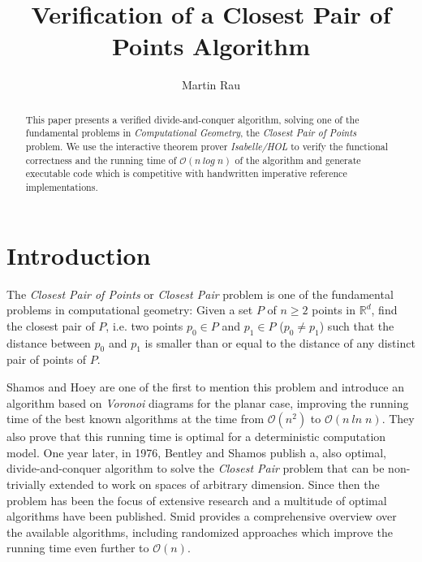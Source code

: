 \documentclass{llncs}
\begin{document}
\title{Verification of a Closest Pair of Points Algorithm}
\author{Martin Rau}
\date{}
\maketitle

\begin{abstract}
This paper presents a verified divide-and-conquer algorithm, solving one of the fundamental problems
in \textit{Computational Geometry}, the \textit{Closest Pair of Points} problem.
We use the interactive theorem prover \textit{Isabelle/HOL} to verify the functional correctness
and the running time of $\mathcal{O}(n\ \mathit{log}\;n)$ of the algorithm and generate executable code 
which is competitive with handwritten imperative reference implementations.
\end{abstract}


\section{Introduction}

The \textit{Closest Pair of Points} or \textit{Closest Pair} problem is one of the fundamental
problems in computational geometry: Given a set $P$ of $n \geq 2$ points in $\mathbb{R}^d$,
find the closest pair of $P$, i.e. two points $p_0 \in P$ and $p_1 \in P$ ($p_0 \ne p_1$) such that 
the distance between $p_0$ and $p_1$ is smaller than or equal to the distance of any distinct pair 
of points of $P$.

Shamos and Hoey \cite{Closest-Point-Problems:1975} are one of the first to mention this problem and
introduce an algorithm based on \textit{Voronoi} diagrams for the planar case, improving the running 
time of the best known algorithms at the time from $\mathcal{O}(n^2)$ to
$\mathcal{O}(n\ \mathit{ln}\;n)$. They also prove that this running time is optimal for a
deterministic computation model. One year later, in 1976, Bentley and Shamos
\cite{Divide-And-Conquer-In-Multidimensional-Space:1976} publish a, also optimal, divide-and-conquer
algorithm to solve the \textit{Closest Pair} problem that can be non-trivially extended to work on
spaces of arbitrary dimension. Since then the problem has been the focus of extensive research and
a multitude of optimal algorithms have been published. Smid \cite{Handbook-Computational-Geometry:2000}
provides a comprehensive overview over the available algorithms, including randomized approaches which
improve the running time even further to $\mathcal{O}(n)$.
\end{document}
